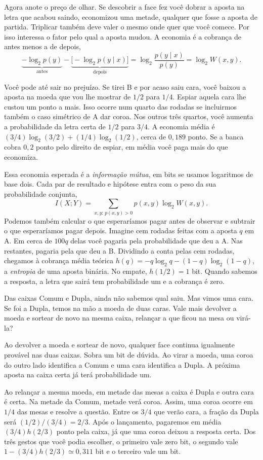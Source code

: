 Agora anote o preço de olhar. Se descobrir a face fez você dobrar a aposta na letra que acabou saindo, economizou uma metade, qualquer que fosse a aposta de partida. Triplicar também deve valer o mesmo onde quer que você comece. Por isso interessa o fator pelo qual a aposta mudou. A economia é a cobrança de antes menos a de depois,
\[
 \underbrace{-\log_2 p(y)}_{\text{antes}}
 -\underbrace{\big[-\log_2 p(y\mid x)\big]}_{\text{depois}}
 =\log_2\frac{p(y\mid x)}{p(y)}=\log_2 W(x,y).
\]

Você pode até sair no prejuízo. Se tirei B e por acaso saiu cara, você baixou a aposta na moeda que vou lhe mostrar de $1/2$ para $1/4$. Espiar aquela cara lhe custou um ponto a mais. Isso ocorre num quarto das rodadas se incluirmos também o caso simétrico de A dar coroa. Nos outros três quartos, você aumenta a probabilidade da letra certa de $1/2$ para $3/4$. A economia média é $(3/4)\log_2(3/2)+(1/4)\log_2(1/2)$, cerca de $0{,}189$ ponto. Se a banca cobra $0{,}2$ ponto pelo direito de espiar, em média você paga mais do que economiza.

Essa economia esperada é a \emph{informação mútua}, em bits se usamos logaritmos de base dois. Cada par de resultado e hipótese entra com o peso da sua probabilidade conjunta,
\[
 I(X;Y)=\sum_{x,y:\,p(x,y)>0}p(x,y)\log_2 W(x,y).
\]
Podemos também calcular o que esperaríamos pagar antes de observar e subtrair o que esperaríamos pagar depois. Imagine cem rodadas feitas com a aposta $q$ em A. Em cerca de $100q$ delas você pagaria pela probabilidade que deu a A. Nas restantes, pagaria pela que deu a B. Dividindo a conta pelas cem rodadas, chegamos à cobrança média teórica $h(q)=-q\log_2 q-(1-q)\log_2(1-q)$, a \emph{entropia} de uma aposta binária. No empate, $h(1/2)=1$ bit. Quando sabemos a resposta, a letra que sairá tem probabilidade um e a cobrança é zero.

Das caixas Comum e Dupla, ainda não sabemos qual saiu. Mas vimos uma cara. Se foi a Dupla, temos na mão a moeda de duas caras. Vale mais devolver a moeda e sortear de novo na mesma caixa, relançar a que ficou na mesa ou virá-la?

Ao devolver a moeda e sortear de novo, qualquer face continua igualmente provável nas duas caixas. Sobra um bit de dúvida. Ao virar a moeda, uma coroa do outro lado identifica a Comum e uma cara identifica a Dupla. A próxima aposta na caixa certa já terá probabilidade um.

Ao relançar a mesma moeda, em metade das mesas a caixa é Dupla e outra cara é certa. Na metade da Comum, metade verá coroa. Assim, uma coroa ocorre em $1/4$ das mesas e resolve a questão. Entre os $3/4$ que verão cara, a fração da Dupla será $(1/2)/(3/4)=2/3$. Após o lançamento, pagaremos em média $(3/4)h(2/3)$ ponto pela caixa, já que uma coroa deixou a resposta certa. Dos três gestos que você podia escolher, o primeiro vale zero bit, o segundo vale $1-(3/4)h(2/3)\simeq0{,}311$ bit e o terceiro vale um bit.

